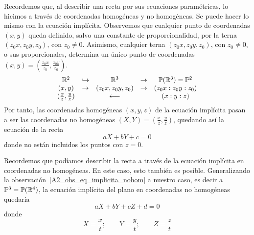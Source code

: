 \begin{obs}
	\label{A2_obs_eq_implicita_nohom}
	Recordemos que, al describir una recta por sus ecuaciones paramétricas, lo hicimos a través de coordenadas homogéneas y no homogéneas. Se puede hacer lo mismo con la ecuación implícita. Observemos que cualquier punto de coordenadas $(x,y)$ queda definido, salvo una constante de proporcionalidad, por la terna $(z_0x,z_0y,z_0)$, con $z_0\not=0$. Asimismo, cualquier terna $(z_0x,z_0y,z_0)$, con $z_0\not=0$, o sus proporcionales, determina un único punto de coordenadas $(x,y)=(\frac{z_0x}{z_0},\frac{z_0y}{z_0})$.
	\begin{equation*}
		\begin{array}{ccccc}
			\mathbb{R}^2&\hookrightarrow&\mathbb{R}^3&\rightarrow &\mathbb{P}(\mathbb{R}^3)=\mathbb{P}^2\\
			(x,y)&\rightarrow &(z_0x,z_0y,z_0)&\rightarrow &(z_0x:z_0y:z_0)\\
			(\frac{x}{z},\frac{y}{z})&&\longleftarrow &&(x:y:z)
		\end{array}
	\end{equation*}
	Por tanto, las coordenadas homogéneas $(x,y,z)$ de la ecuación implícita pasan a ser las coordenadas no homogéneas $(X,Y)=(\frac{x}{z},\frac{y}{z})$, quedando así la ecuación de la recta
	\begin{equation}
		\label{A2_eq_implicita_nohom}
		aX+bY+c=0
	\end{equation}
	donde no están incluidos los puntos con $z=0$.\\
\end{obs}

\begin{obs}
	Recordemos que podíamos describir la recta a través de la ecuación implícita en coordenadas no homogéneas. En este caso, esto también es posible. Generalizando la observación~\ref{A2_obs_eq_implicita_nohom} a nuestro caso, es decir a $\mathbb{P}^3=\mathbb{P}(\mathbb{R}^4)$, la ecuación implícita del plano en coordenadas no homogéneas quedaría
	\begin{equation}
		\label{A2_eq_implicita_plano_nohom}
		aX+bY+cZ+d=0
	\end{equation}
	donde 
	\begin{equation*}
		X=\frac{x}{t};\qquad Y=\frac{y}{t};\qquad Z=\frac{z}{t}
	\end{equation*}\\
\end{obs}